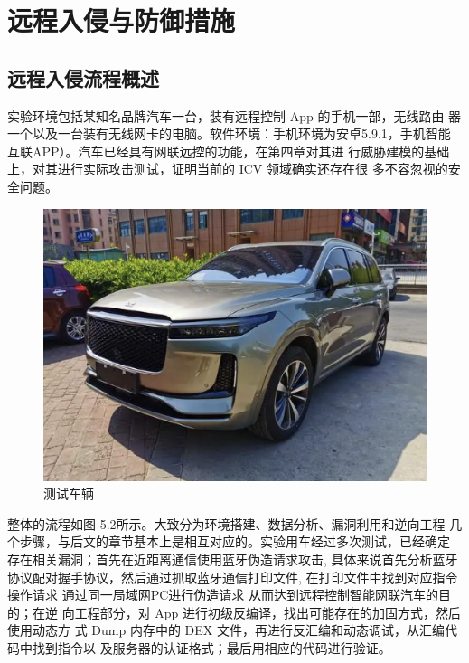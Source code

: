 \chapter{远程入侵与防御措施}
\label{ch5}
\section{远程入侵流程概述}
实验环境包括某知名品牌汽车一台，装有远程控制 App 的手机一部，无线路由
器一个以及一台装有无线网卡的电脑。软件环境：手机环境为安卓5.9.1，手机智能互联APP）。汽车已经具有网联远控的功能，在第四章对其进
行威胁建模的基础上，对其进行实际攻击测试，证明当前的 ICV 领域确实还存在很
多不容忽视的安全问题。
\begin{figure}
    \centering
    \includegraphics[scale=0.5]{resources/img/i14.png}
    \caption{测试车辆}
  \end{figure}
\newline
整体的流程如图 5.2所示。大致分为环境搭建、数据分析、漏洞利用和逆向工程
几个步骤，与后文的章节基本上是相互对应的。实验用车经过多次测试，已经确定
存在相关漏洞；首先在近距离通信使用蓝牙伪造请求攻击, 具体来说首先分析蓝牙协议配对握手协议，然后通过抓取蓝牙通信打印文件, 在打印文件中找到对应指令操作请求
通过同一局域网PC进行伪造请求 从而达到远程控制智能网联汽车的目的；在逆
向工程部分，对 App 进行初级反编译，找出可能存在的加固方式，然后使用动态方
式 Dump 内存中的 DEX 文件，再进行反汇编和动态调试，从汇编代码中找到指令以
及服务器的认证格式；最后用相应的代码进行验证。
